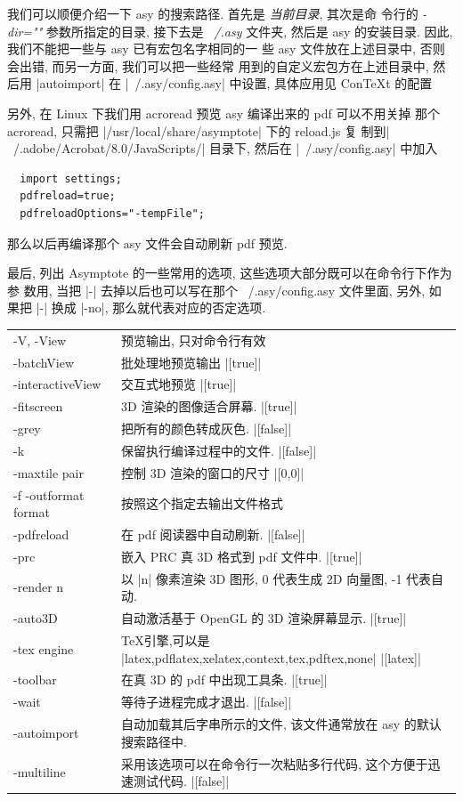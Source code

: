 \documentclass[nofonts,CJKnormalspaces]{ctexbook}
\begin{document}
我们可以顺便介绍一下 asy 的搜索路径. 首先是 \emph{当前目录}, 其次是命
令行的 \emph{-dir=""} 参数所指定的目录, 接下去是 \emph{~/.asy} 文件夹,
然后是 asy 的安装目录. 因此, 我们不能把一些与 asy 已有宏包名字相同的一
些 asy 文件放在上述目录中, 否则会出错, 而另一方面, 我们可以把一些经常
用到的自定义宏包方在上述目录中, 然后用 |autoimport| 在
|~/.asy/config.asy| 中设置, 具体应用见 ConTeXt 的配置
\pageref{ConTeXt:Settings}

另外, 在 Linux 下我们用 acroread 预览 asy 编译出来的 pdf 可以不用关掉
那个 acroread, 只需把 |/usr/local/share/asymptote| 下的 reload.js  复
制到|~/.adobe/Acrobat/8.0/JavaScripts/| 目录下, 然后在
|~/.asy/config.asy| 中加入
\begin{lstlisting}
  import settings;
  pdfreload=true;
  pdfreloadOptions="-tempFile";
\end{lstlisting}
那么以后再编译那个 asy 文件会自动刷新 pdf 预览.

最后, 列出 Asymptote 的一些常用的选项, 这些选项大部分既可以在命令行下作为参
数用, 当把 |-| 去掉以后也可以写在那个 ~/.asy/config.asy 文件里面, 另外, 如
果把 |-| 换成 |-no|, 那么就代表对应的否定选项.

\begin{longtable}[l]{l@{\hspace*{4em}}p{\dimexpr\textwidth-5em}}
  -V, -View   & 预览输出, 只对命令行有效 \\
  -batchView  & 批处理地预览输出 |[true]| \\
  -interactiveView & 交互式地预览 |[true]| \\
  -fitscreen &  3D 渲染的图像适合屏幕. |[true]| \\
  -grey & 把所有的颜色转成灰色. |[false]|\\
  -k & 保留执行编译过程中的文件. |[false]| \\
  -maxtile pair & 控制 3D 渲染的窗口的尺寸 |[0,0]|\\
  -f -outformat format & 按照这个指定去输出文件格式 \\
  -pdfreload & 在 pdf 阅读器中自动刷新. |[false]| \\
  -prc & 嵌入 PRC 真 3D 格式到 pdf 文件中. |[true]| \\
  -render n & 以 |n| 像素渲染 3D 图形, 0 代表生成 2D 向量图, -1 代表自
  动. \\
  -auto3D & 自动激活基于 OpenGL 的 3D 渲染屏幕显示. |[true]|\\
  -tex engine & \TeX 引擎,可以是 |latex,pdflatex,xelatex,context,tex,pdftex,none|
  |[latex]|\\
  -toolbar & 在真 3D 的 pdf 中出现工具条. |[true]|\\
  -wait & 等待子进程完成才退出. |[false]| \\
  -autoimport & 自动加载其后字串所示的文件, 该文件通常放在 asy 的默认搜索路径中.\\
  -multiline & 采用该选项可以在命令行一次粘贴多行代码, 这个方便于迅速测试代码. |[false]|\\

\end{longtable}
\end{document}
